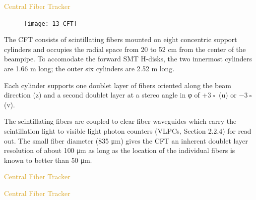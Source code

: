 \begin{frame}{\textcolor{Goldenrod}{Central Fiber Tracker}}
  \begin{overlayarea}{\textwidth}{\textheight}
    \begin{figure}[h]\centering
      \texttt{[image: 13\_CFT]}
    \end{figure}
    \itt[<only@+>]  

    \item The CFT consists of scintillating fibers mounted on eight concentric
      support cylinders and occupies the radial space from 20 to 52 cm from
      the center of the beampipe. To accomodate the forward SMT H-disks, the
      two innermost cylinders are 1.66 m long; the outer six cylinders are
      2.52 m long.
      
    \item 
      Each cylinder supports one doublet layer of fibers oriented
      along the beam direction (z) and a second doublet layer at a
      stereo angle in φ of +3◦ (u) or −3◦ (v).

    \item
      The scintillating fibers are coupled to clear fiber waveguides
      which carry the scintillation light to visible light photon
      counters (VLPCs, Section 2.2.4) for read out. The small fiber
      diameter (835 μm) gives the CFT an inherent doublet layer
      resolution of about 100 μm as long as the location of the
      individual fibers is known to better than 50 μm.
      

      
      \tti
\end{overlayarea}
\end{frame}

\begin{frame}{\textcolor{Goldenrod}{Central Fiber Tracker}}
  \begin{overlayarea}{\textwidth}{\textheight}
    \begin{figure}[h]\centering
      
    \end{figure}
    \itt[<only@+>]
    
    \tti
  \end{overlayarea}
\end{frame}


\begin{frame}{\textcolor{Goldenrod}{Central Fiber Tracker}}
  \begin{overlayarea}{\textwidth}{\textheight}
    \begin{figure}[h]\centering
      
    \end{figure}
    \itt[<only@+>]
    
    \tti
  \end{overlayarea}
\end{frame}


